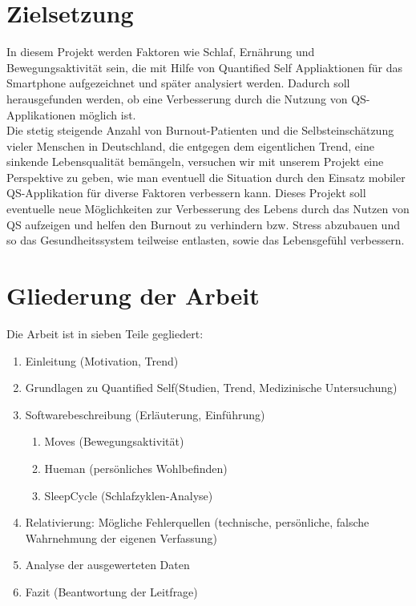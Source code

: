 \section{Zielsetzung}
\label{ch:Einleitung:sec:Zielsetzung}

In diesem Projekt werden Faktoren wie Schlaf, Ernährung und Bewegungsaktivität sein, die mit Hilfe von Quantified Self Appliaktionen für das Smartphone aufgezeichnet und später analysiert werden. %
Dadurch soll herausgefunden werden, ob eine Verbesserung durch die Nutzung von QS-Applikationen möglich ist. \\
Die stetig steigende Anzahl von Burnout-Patienten und die Selbsteinschätzung vieler Menschen in Deutschland, die entgegen dem eigentlichen Trend, eine sinkende Lebensqualität bemängeln, versuchen wir mit unserem Projekt eine Perspektive zu geben, wie man eventuell die Situation durch den Einsatz mobiler QS-Applikation für diverse Faktoren verbessern kann. 
Dieses Projekt soll eventuelle neue Möglichkeiten zur Verbesserung des Lebens durch das Nutzen von QS aufzeigen und helfen den Burnout zu verhindern bzw. Stress abzubauen und so das Gesundheitssystem teilweise entlasten, sowie das Lebensgefühl verbessern. 

\section{Gliederung der Arbeit}
\label{ch:Einleitung:sec:GliederungDerArbeit}

Die Arbeit ist in sieben Teile gegliedert:

\begin{enumerate}
\def\labelenumi{\arabic{enumi}.}
\itemsep1pt\parskip0pt
\item
  Einleitung (Motivation, Trend)
\item
  Grundlagen zu Quantified Self(Studien, Trend, Medizinische
  Untersuchung)
\item
  Softwarebeschreibung (Erläuterung, Einführung)

  \begin{enumerate}
  \def\labelenumii{\alph{enumii}.}
  \itemsep1pt\parskip0pt
  \item
    Moves (Bewegungsaktivität)\\
  \item
    Hueman (persönliches Wohlbefinden)\\
  \item
    SleepCycle (Schlafzyklen-Analyse)
  \end{enumerate}
\item
  Relativierung: Mögliche Fehlerquellen (technische, persönliche,
  falsche Wahrnehmung der eigenen Verfassung)
\item
  Analyse der ausgewerteten Daten
\item
  Fazit (Beantwortung der Leitfrage)
\end{enumerate}

